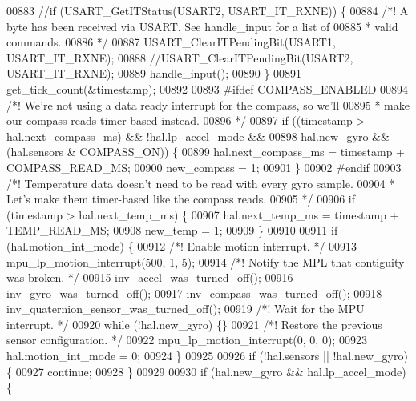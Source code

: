 \begin{DoxyCode}
{{{{{{{{00883     \textcolor{comment}{//if (USART\_GetITStatus(USART2, USART\_IT\_RXNE)) \{}
00884         \textcolor{comment}{/*! A byte has been received via USART. See handle\_input for a list of}
00885 \textcolor{comment}{         * valid commands.}
00886 \textcolor{comment}{         */}
00887         USART_ClearITPendingBit(USART1, USART_IT_RXNE);
00888         \textcolor{comment}{//USART\_ClearITPendingBit(USART2, USART\_IT\_RXNE);}
00889         handle_input();
00890     \}
00891     get_tick_count(&timestamp);
00892 
00893 \textcolor{preprocessor}{#}\textcolor{preprocessor}{ifdef} \textcolor{preprocessor}{COMPASS\_ENABLED}
00894         \textcolor{comment}{/*! We're not using a data ready interrupt for the compass, so we'll}
00895 \textcolor{comment}{         * make our compass reads timer-based instead.}
00896 \textcolor{comment}{         */}
00897         \textcolor{keywordflow}{if} ((timestamp > hal.next\_compass\_ms) && !hal.lp\_accel\_mode &&
00898             hal.new\_gyro && (hal.sensors & COMPASS\_ON)) \{
00899             hal.next\_compass\_ms = timestamp + COMPASS\_READ\_MS;
00900             new\_compass = 1;
00901         \}
00902 \textcolor{preprocessor}{#}\textcolor{preprocessor}{endif}
00903         \textcolor{comment}{/*! Temperature data doesn't need to be read with every gyro sample.}
00904 \textcolor{comment}{         * Let's make them timer-based like the compass reads.}
00905 \textcolor{comment}{         */}
00906         \textcolor{keywordflow}{if} (timestamp > hal.next_temp_ms) \{
00907             hal.next_temp_ms = timestamp + TEMP_READ_MS;
00908             new\_temp = 1;
00909         \}
00910 
00911     \textcolor{keywordflow}{if} (hal.motion_int_mode) \{
00912         \textcolor{comment}{/*! Enable motion interrupt. */}
00913         mpu\_lp\_motion\_interrupt(500, 1, 5);
00914         \textcolor{comment}{/*! Notify the MPL that contiguity was broken. */}
00915         inv\_accel\_was\_turned\_off();
00916         inv\_gyro\_was\_turned\_off();
00917         inv\_compass\_was\_turned\_off();
00918         inv\_quaternion\_sensor\_was\_turned\_off();
00919         \textcolor{comment}{/*! Wait for the MPU interrupt. */}
00920         \textcolor{keywordflow}{while} (!hal.new_gyro) \{\}
00921         \textcolor{comment}{/*! Restore the previous sensor configuration. */}
00922         mpu\_lp\_motion\_interrupt(0, 0, 0);
00923         hal.motion_int_mode = 0;
00924     \}
00925 
00926     \textcolor{keywordflow}{if} (!hal.sensors || !hal.new_gyro) \{
00927         \textcolor{keywordflow}{continue};
00928     \}
00929 
00930         \textcolor{keywordflow}{if} (hal.new_gyro && hal.lp_accel_mode) \{
}}}}}}}}
\end{DoxyCode}
